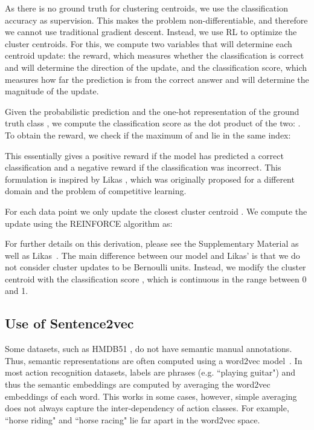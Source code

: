 \documentclass[runningheads]{llncs}
\begin{document}
As there is no ground truth for clustering centroids, we use the classification accuracy as supervision. This makes the problem non-differentiable, and therefore we cannot use traditional gradient descent. Instead, we use RL to optimize the cluster centroids.
For this, we compute two variables that will determine each centroid update: 
the reward, which measures whether the classification is correct and will determine the direction of the update, and the classification score, which measures how far the prediction is from the correct answer and will determine the magnitude of the update. 

Given the probabilistic prediction  and the one-hot representation of the ground truth class , we compute the classification score as the dot product of the two: . To obtain the reward, we check if the maximum of  and  lie in the same index: 

 


This essentially gives a positive reward if the model has predicted a correct classification and a negative reward if the classification was incorrect. This formulation is inspired by Likas \cite{likas1999reinforcement}, which was originally proposed for a different domain and the problem of competitive learning. 

For each data point  we only update the closest cluster centroid . We compute the update  using the REINFORCE \cite{likas1999reinforcement} algorithm as:




















For further details on this derivation, please see the Supplementary Material as well as Likas~\cite{likas1999reinforcement}. The main  difference between our model and Likas' is that we do not consider cluster updates to be Bernoulli units. Instead, we modify the cluster centroid with the classification score , which is continuous in the range between 0 and 1.

\iffalse
\subsection{Use of Sentence2vec}
\label{sen2vec}

Some datasets, such as HMDB51 \cite{hmdb}, do not have semantic manual annotations. Thus, semantic representations are often computed using a word2vec model~\cite{word2vec}. In most action recognition datasets, labels are phrases (e.g. ``playing guitar") and thus the semantic embeddings are computed by averaging the word2vec embeddings of each word. 
This works in some cases, however, simple averaging does not always capture the inter-dependency of action classes. 
For example, ``horse riding" and ``horse racing" lie far apart in the word2vec space. 
\end{document}
